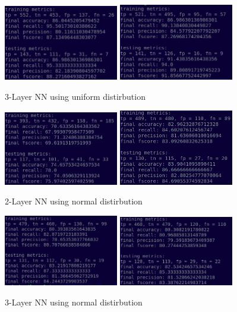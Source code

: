 \documentclass[a4paper,10pt,twocolumn]{article}
\begin{document}
\begin{figure}[h!]
\centering
\includegraphics[scale=1.0, width=5cm]{Fig3.png}
\includegraphics[scale=1.0, width=5cm]{Fig4.png}
\caption*{3-Layer NN using uniform distirbution}
\end{figure}

\begin{figure}[h!]
\centering
\includegraphics[scale=1.0, width=5cm]{Fig5.png}
\includegraphics[scale=1.0, width=5cm]{Fig6.png}
\caption*{2-Layer NN using normal distirbution}
\end{figure}

\begin{figure}[h!]
\centering
\includegraphics[scale=1.0, width=5cm]{Fig7.png}
\includegraphics[scale=1.0, width=5cm]{Fig8.png}
\caption*{3-Layer NN using normal distirbution}
\end{figure}
\end{document}
